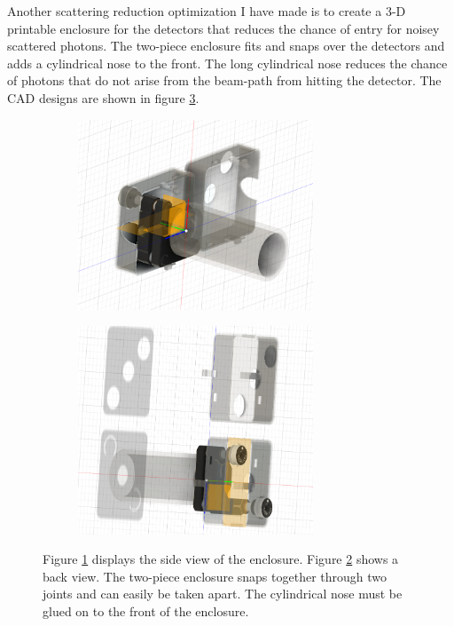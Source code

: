 \documentclass[letterpaper, 11 pt]{book}
\begin{document}
Another scattering reduction optimization I have made is to create a 3-D
printable enclosure for the detectors that reduces the chance of entry for
noisey scattered photons. The two-piece enclosure fits and snaps over the
detectors and adds a cylindrical nose to the front. The long cylindrical nose
reduces the chance of photons that do not arise from the beam-path from hitting
the detector. The CAD designs are shown in figure \ref{fig:cad_enclose}.
\begin{figure}[H]%
        \centering
        \begin{subfigure}{.4\textwidth}
        \includegraphics[width=7cm]{enclosure_1.png}
        \caption{ }
        \label{fig:side}
        \end{subfigure}
        \begin{subfigure}{.4\textwidth}
        \includegraphics[width = 7cm]{enclosure_2.png}
        \caption{ }
        \label{fig:back}
        \end{subfigure}
        \caption{Figure \ref{fig:side} displays the side view of the enclosure.
        Figure \ref{fig:back} shows a back view. The two-piece enclosure snaps
        together through two joints and can easily be taken apart. The
        cylindrical nose must be glued on to the front of the enclosure.}
        \label{fig:cad_enclose}
    \end{figure}
\end{document}
